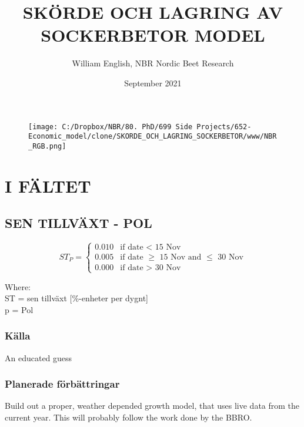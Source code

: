 \documentclass[fleqn]{article}
\title{SKÖRDE OCH LAGRING AV SOCKERBETOR MODEL}
\author{William English, NBR Nordic Beet Research}
\date{September 2021}
\begin{document}


\begin{figure}[ht!]
\centering
\texttt{[image: C:/Dropbox/NBR/80. PhD/699 Side Projects/652-Economic\_model/clone/SKORDE\_OCH\_LAGRING\_SOCKERBETOR/www/NBR\_RGB.png]}
\label{NBR_logo}
\end{figure}

\maketitle

\pagebreak


\section{I FÄLTET}
  
  \subsection{SEN TILLVÄXT - POL}

    \begin{equation}
      ST_P = 
      \begin{cases}
        0.010 & \text{if date < 15 Nov}\\
        0.005 & \text{if date $\geq$ 15 Nov and $\leq$ 30 Nov}\\
        0.000 & \text{if date > 30 Nov}
      \end{cases}
    \end{equation}
    
    Where:\\
    \hangindent=1.5cm
    ST = sen tillväxt [\%-enheter per dygnt]\\
    p = Pol

    \subsubsection{Källa}
    An educated guess

    \subsubsection{Planerade förbättringar}
    Build out a proper, weather depended growth model, that uses live data from the current year. This will probably follow the work done by the BBRO.
  
\end{document}
